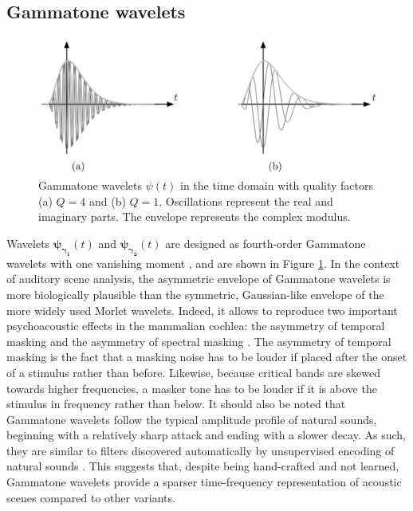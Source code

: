 \documentclass[journal]{IEEEtran}
\begin{document}
\subsection{Gammatone wavelets}
\begin{figure}
\begin{center}
\includegraphics[width=\columnwidth]{bw/gammatones}
\caption{
\label{fig:gammatones}
Gammatone wavelets $\psi(t)$ in the time domain with quality factors (a) $Q = 4$ and (b) $Q = 1$. 
Oscillations represent the real and imaginary parts. The envelope represents the complex modulus.}
\end{center}
\end{figure}
Wavelets
$\boldsymbol{\psi_{\gamma_1}}(t)$ and $\boldsymbol{\psi_{\gamma_2}}(t)$ are designed as fourth-order Gammatone
wavelets with one vanishing moment \cite{Venkitaraman2014}, and are shown in Figure \ref{fig:gammatones}.
In the context of auditory scene analysis, the asymmetric envelope of Gammatone wavelets is more biologically plausible than the symmetric, Gaussian-like envelope of the more widely used Morlet wavelets.
Indeed, it allows to reproduce two important psychoacoustic effects in the mammalian cochlea: the asymmetry of temporal masking and the asymmetry of spectral masking  \cite{Fastl2007}.
The asymmetry of temporal masking is the fact that a masking noise has to be louder if placed after the onset of a stimulus rather than before.
Likewise, because critical bands are skewed towards higher frequencies, a masker tone has to be louder if it is above the stimulus in frequency rather than below.
It should also be noted that Gammatone wavelets follow the typical amplitude profile of natural sounds, beginning with a relatively sharp attack and ending with a slower decay.
As such, they are similar to filters discovered automatically by unsupervised encoding of natural sounds \cite{Smith2006}.
This suggests that, despite being hand-crafted and not learned, Gammatone wavelets provide a sparser time-frequency representation of acoustic scenes compared to other variants.
\end{document}
